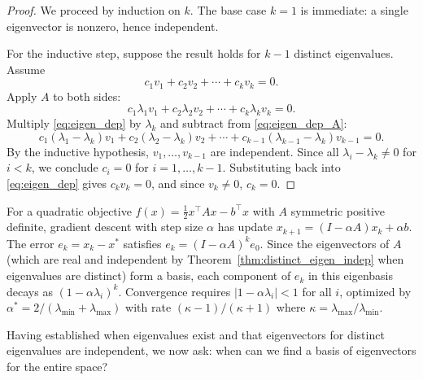\documentclass[11pt,a4paper]{article}
\begin{document}
\begin{proof}
We proceed by induction on $k$.  The base case $k = 1$ is immediate:
a single eigenvector is nonzero, hence independent.

For the inductive step, suppose the result holds for $k - 1$ distinct
eigenvalues.  Assume
\begin{equation}
\label{eq:eigen_dep}
  c_1 v_1 + c_2 v_2 + \cdots + c_k v_k = 0.
\end{equation}
Apply $A$ to both sides:
\begin{equation}
\label{eq:eigen_dep_A}
  c_1 \lambda_1 v_1 + c_2 \lambda_2 v_2 + \cdots + c_k \lambda_k v_k = 0.
\end{equation}
Multiply \eqref{eq:eigen_dep} by $\lambda_k$ and subtract from
\eqref{eq:eigen_dep_A}:
\[
  c_1(\lambda_1 - \lambda_k) v_1 + c_2(\lambda_2 - \lambda_k) v_2
  + \cdots + c_{k-1}(\lambda_{k-1} - \lambda_k) v_{k-1} = 0.
\]
By the inductive hypothesis, $v_1, \ldots, v_{k-1}$ are independent.
Since all $\lambda_i - \lambda_k \neq 0$ for $i < k$, we conclude
$c_i = 0$ for $i = 1, \ldots, k-1$.  Substituting back into
\eqref{eq:eigen_dep} gives $c_k v_k = 0$, and since $v_k \neq 0$,
$c_k = 0$.
\end{proof}

\begin{rlconnection}[title={Eigenvalues and Gradient Descent Convergence}]
For a quadratic objective $f(x) = \frac{1}{2}x^\top A x - b^\top x$ with
$A$ symmetric positive definite, gradient descent with step size $\alpha$
has update $x_{k+1} = (I - \alpha A)x_k + \alpha b$.  The error
$e_k = x_k - x^*$ satisfies $e_k = (I - \alpha A)^k e_0$.  Since the
eigenvectors of $A$ (which are real and independent by
Theorem~\ref{thm:distinct_eigen_indep} when eigenvalues are distinct)
form a basis, each component of $e_k$ in this eigenbasis decays as
$(1 - \alpha \lambda_i)^k$.  Convergence requires
$|1 - \alpha \lambda_i| < 1$ for all $i$, optimized by
$\alpha^* = 2/(\lambda_{\min} + \lambda_{\max})$ with rate
$(\kappa - 1)/(\kappa + 1)$ where $\kappa = \lambda_{\max}/\lambda_{\min}$.
\end{rlconnection}

Having established when eigenvalues exist and that eigenvectors for
distinct eigenvalues are independent, we now ask: when can we find a
basis of eigenvectors for the entire space?

\end{document}
